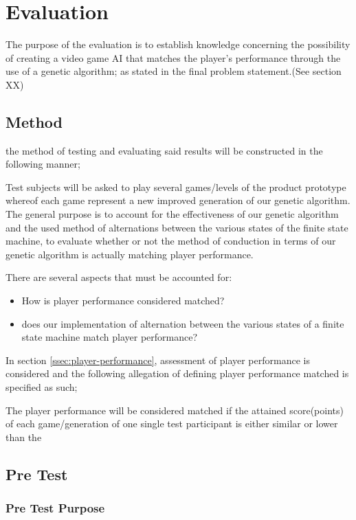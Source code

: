 \section{Evaluation} \label{sec:evaluation}
The purpose of the evaluation is to establish knowledge concerning the possibility of creating a video game AI that matches the player's performance through the use of a genetic algorithm; as stated in the final problem statement.(See section XX)


\subsection{Method}
the method of testing and evaluating said results will be constructed in the following manner;

Test subjects will be asked to play several games/levels of the product prototype whereof each game represent a new improved generation of our genetic algorithm. The general purpose is to account for the effectiveness of our genetic algorithm and the used method of alternations between the various states of the finite state machine, to evaluate whether or not the method of conduction in terms of our genetic algorithm is actually matching player performance.

There are several aspects that must be accounted for:

\begin{itemize}
\item How is player performance considered matched?
\item does our implementation of alternation between the various states of a finite state machine match player performance?
\end{itemize}



In section \ref{ssec:player-performance}, assessment of player performance is considered and the following allegation of defining player performance matched is specified as such;

The player performance will be considered matched if the attained score(points) of each game/generation of one single test participant is either similar or lower than the 

\subsection{Pre Test}

\subsubsection{Pre Test Purpose}

